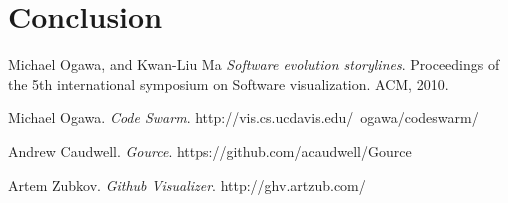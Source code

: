 \documentclass{article}
\begin{document}
\section {Conclusion}

\newpage

\begin{thebibliography}{9}
 
Michael Ogawa, and Kwan-Liu Ma
\textit{Software evolution storylines}.
Proceedings of the 5th international symposium on Software visualization. ACM, 2010.

Michael Ogawa.
\textit{Code Swarm}.
http://vis.cs.ucdavis.edu/~ogawa/codeswarm/

Andrew Caudwell.
\textit{Gource}.
https://github.com/acaudwell/Gource

Artem  Zubkov.
\textit{Github Visualizer}.
http://ghv.artzub.com/

\end{thebibliography}
\end{document}
